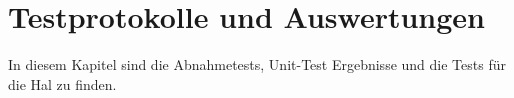 \section{Testprotokolle und Auswertungen}\label{sec:testprotokolle-und-auswertungen}

In diesem Kapitel sind die Abnahmetests, Unit-Test Ergebnisse und die Tests für die Hal zu finden.








